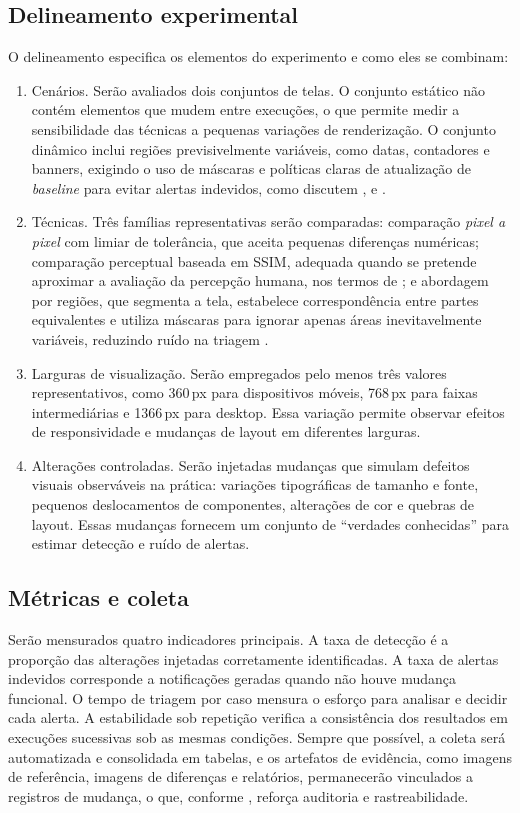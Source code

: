 \documentclass{UNESC}
\begin{document}
\subsection{Delineamento experimental}
O delineamento especifica os elementos do experimento e como eles se combinam:
\begin{enumerate}[label=\alph*),leftmargin=1.5em]
    \item Cenários. Serão avaliados dois conjuntos de telas. O conjunto estático não contém elementos que mudem entre execuções, o que permite medir a sensibilidade das técnicas a pequenas variações de renderização. O conjunto dinâmico inclui regiões previsivelmente variáveis, como datas, contadores e banners, exigindo o uso de máscaras e políticas claras de atualização de \emph{baseline} para evitar alertas indevidos, como discutem ,  e .
    \item Técnicas. Três famílias representativas serão comparadas: comparação \emph{pixel a pixel} com limiar de tolerância, que aceita pequenas diferenças numéricas; comparação perceptual baseada em SSIM, adequada quando se pretende aproximar a avaliação da percepção humana, nos termos de ; e abordagem por regiões, que segmenta a tela, estabelece correspondência entre partes equivalentes e utiliza máscaras para ignorar apenas áreas inevitavelmente variáveis, reduzindo ruído na triagem \cite{tanno2020}.
    \item Larguras de visualização. Serão empregados pelo menos três valores representativos, como 360\,px para dispositivos móveis, 768\,px para faixas intermediárias e 1366\,px para desktop. Essa variação permite observar efeitos de responsividade e mudanças de layout em diferentes larguras.
    \item Alterações controladas. Serão injetadas mudanças que simulam defeitos visuais observáveis na prática: variações tipográficas de tamanho e fonte, pequenos deslocamentos de componentes, alterações de cor e quebras de layout. Essas mudanças fornecem um conjunto de ``verdades conhecidas'' para estimar detecção e ruído de alertas.
\end{enumerate}

\subsection{Métricas e coleta}
Serão mensurados quatro indicadores principais. A taxa de detecção é a proporção das alterações injetadas corretamente identificadas. A taxa de alertas indevidos corresponde a notificações geradas quando não houve mudança funcional. O tempo de triagem por caso mensura o esforço para analisar e decidir cada alerta. A estabilidade sob repetição verifica a consistência dos resultados em execuções sucessivas sob as mesmas condições. Sempre que possível, a coleta será automatizada e consolidada em tabelas, e os artefatos de evidência, como imagens de referência, imagens de diferenças e relatórios, permanecerão vinculados a registros de mudança, o que, conforme , reforça auditoria e rastreabilidade.
\end{document}
